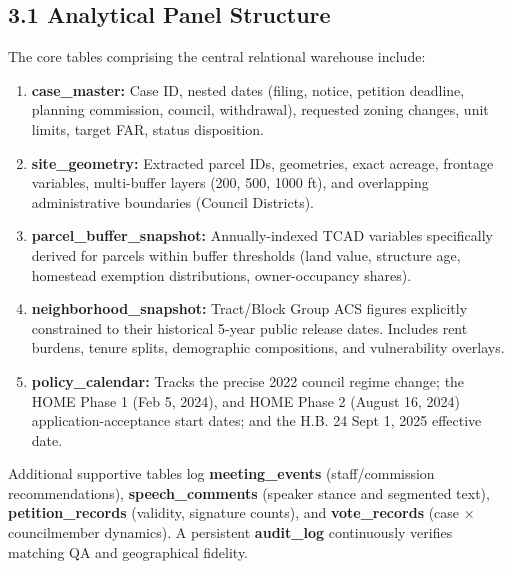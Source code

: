 \subsection*{3.1 Analytical Panel Structure}
The core tables comprising the central relational warehouse include:
\begin{enumerate}
    \item \textbf{case\_master:} Case ID, nested dates (filing, notice, petition deadline, planning commission, council, withdrawal), requested zoning changes, unit limits, target FAR, status disposition.
    \item \textbf{site\_geometry:} Extracted parcel IDs, geometries, exact acreage, frontage variables, multi-buffer layers (200, 500, 1000 ft), and overlapping administrative boundaries (Council Districts).
    \item \textbf{parcel\_buffer\_snapshot:} Annually-indexed TCAD variables specifically derived for parcels within buffer thresholds (land value, structure age, homestead exemption distributions, owner-occupancy shares).
    \item \textbf{neighborhood\_snapshot:} Tract/Block Group ACS figures explicitly constrained to their historical 5-year public release dates. Includes rent burdens, tenure splits, demographic compositions, and vulnerability overlays.
    \item \textbf{policy\_calendar:} Tracks the precise 2022 council regime change; the HOME Phase 1 (Feb 5, 2024), and HOME Phase 2 (August 16, 2024) application-acceptance start dates; and the H.B. 24 Sept 1, 2025 effective date.
\end{enumerate}

Additional supportive tables log \textbf{meeting\_events} (staff/commission recommendations), \textbf{speech\_comments} (speaker stance and segmented text), \textbf{petition\_records} (validity, signature counts), and \textbf{vote\_records} (case × councilmember dynamics). A persistent \textbf{audit\_log} continuously verifies matching QA and geographical fidelity.

